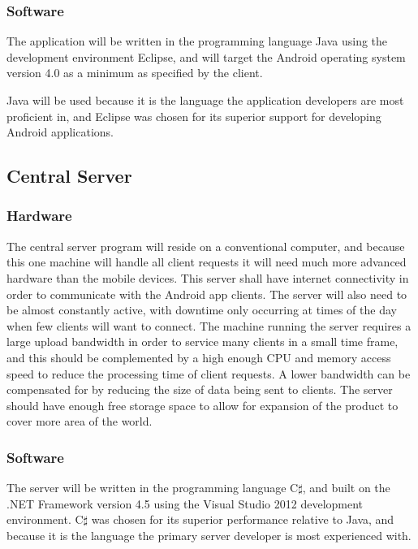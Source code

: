 		\subsubsection{Software}
			The application will be written in the programming language Java 
			using the development environment Eclipse, and will target the 
			Android operating system version 4.0 as a minimum as specified by 
			the client.

			Java will be used because it is the language the application 
			developers are most proficient in, and Eclipse was chosen for its 
			superior support for developing Android applications.
	\subsection{Central Server}
		\subsubsection{Hardware}
			The central server program will reside on a conventional computer, 
			and because this one machine will handle all client requests it 
			will need much more advanced hardware than the mobile devices. 
			This server shall have internet connectivity in order to 
			communicate with the Android app clients. The server will also 
			need to be almost constantly active, with downtime only occurring 
			at times of the day when few clients will want to connect. The 
			machine running the server requires a large upload bandwidth in 
			order to service many clients in a small time frame, and this 
			should be complemented by a high enough CPU and memory access 
			speed to reduce the processing time of client requests. A lower 
			bandwidth can be compensated for by reducing the size of data 
			being sent to clients. The server should have enough free storage 
			space to allow for expansion of the product to cover more area of 
			the world.
		\subsubsection{Software}
			The server will be written in the programming language C$\sharp$, 
			and built on the .NET Framework version 4.5 using the Visual 
			Studio 2012 development environment. C$\sharp$ was chosen for its 
			superior performance relative to Java, and because it is the 
			language the primary server developer is most experienced with. 
